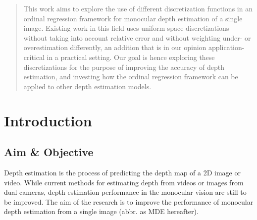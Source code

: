 \documentclass[12pt,twoside]{article}
\begin{document}
\maketitle


\begin{abstract}
\label{sec:abstract}

This work aims to explore the use of different discretization functions in an ordinal regression framework for monocular depth estimation of a single image. Existing work in this field uses uniform space discretizations without taking into account relative error and without weighting under- or overestimation differently, an addition that is in our opinion application-critical in a practical setting. Our goal is hence exploring these discretizations for the purpose of improving the accuracy of depth estimation, and investing how the ordinal regression framework can be applied to other depth estimation models.

\end{abstract}

\tableofcontents





\clearpage
\section{Introduction}

\subsection{Aim \& Objective}
Depth estimation is the process of predicting the depth map of a 2D image or video. While current methods for estimating depth from videos or images from dual cameras, depth estimation performance in the monocular vision are still to be improved. The aim of the research is to improve the performance of monocular depth estimation from a single image (abbr. as MDE hereafter).
\end{document}
